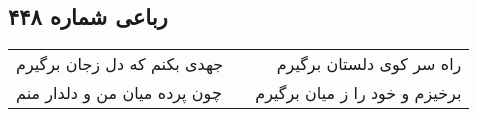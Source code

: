 \begin{center}
\section*{رباعی شماره ۴۴۸}
\label{sec:sh448}
\begin{longtable}{l p{0.5cm} r}
جهدی بکنم که دل زجان برگیرم
&&
راه سر کوی دلستان برگیرم
\\
چون پرده میان من و دلدار منم
&&
برخیزم و خود را ز میان برگیرم
\\
\end{longtable}
\end{center}
